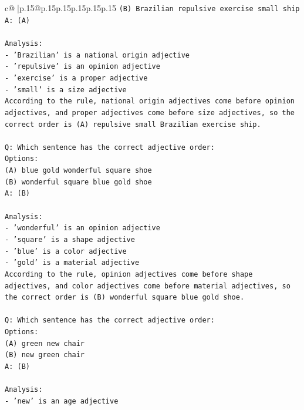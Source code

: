 \documentclass{article}
\begin{document}
{\begin{supertabular}{c@{$\;$}|p{.15\linewidth}@{}p{.15\linewidth}p{.15\linewidth}p{.15\linewidth}p{.15\linewidth}p{.15\linewidth}}
{{{\texttt{(B) Brazilian repulsive exercise small ship} \\
\texttt{A: (A)} \\
\\ 
\texttt{Analysis: } \\
\texttt{{-} 'Brazilian' is a national origin adjective} \\
\texttt{{-} 'repulsive' is an opinion adjective} \\
\texttt{{-} 'exercise' is a proper adjective} \\
\texttt{{-} 'small' is a size adjective} \\
\texttt{According to the rule, national origin adjectives come before opinion adjectives, and proper adjectives come before size adjectives, so the correct order is (A) repulsive small Brazilian exercise ship.} \\
\\ 
\texttt{Q: Which sentence has the correct adjective order:} \\
\texttt{Options:} \\
\texttt{(A) blue gold wonderful square shoe} \\
\texttt{(B) wonderful square blue gold shoe} \\
\texttt{A: (B)} \\
\\ 
\texttt{Analysis: } \\
\texttt{{-} 'wonderful' is an opinion adjective} \\
\texttt{{-} 'square' is a shape adjective} \\
\texttt{{-} 'blue' is a color adjective} \\
\texttt{{-} 'gold' is a material adjective} \\
\texttt{According to the rule, opinion adjectives come before shape adjectives, and color adjectives come before material adjectives, so the correct order is (B) wonderful square blue gold shoe.} \\
\\ 
\texttt{Q: Which sentence has the correct adjective order:} \\
\texttt{Options:} \\
\texttt{(A) green new chair} \\
\texttt{(B) new green chair} \\
\texttt{A: (B)} \\
\\ 
\texttt{Analysis: } \\
\texttt{{-} 'new' is an age adjective} \\
}}}
\end{supertabular}}
\end{document}
